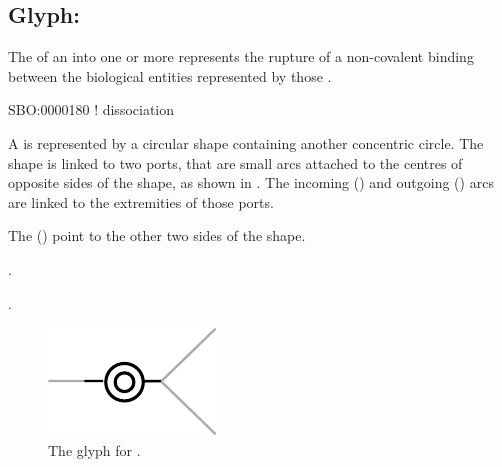 \subsection{Glyph: }
\label{sec:dissociation}

The  of an  into one or more  represents the rupture of a non-covalent binding between the biological entities represented by those .

\begin{glyphDescription}

\glyphSboTerm
SBO:0000180 ! dissociation



\glyphContainer
A  is represented by a circular shape containing another concentric circle.
The shape is linked to two ports, that are small arcs attached to the centres of opposite sides of the shape, as shown in .
The incoming  () and outgoing  () arcs are linked to the extremities of those ports.

The  () point to the other two sides of the shape.

\glyphLabel
{}.

\glyphAux
{}.

\end{glyphDescription}

\begin{figure}[H]
  \centering
  \includegraphics{images/dissociation}
  \caption{The \PD glyph for .}
  \label{fig:dissociation}
\end{figure}

